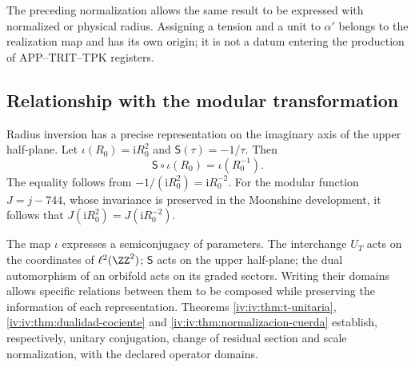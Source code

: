 The preceding normalization allows the same result to be expressed with
normalized or physical radius. Assigning a tension and a
unit to \(\alpha'\) belongs to the realization map and has
its own origin; it is not a datum entering the production
of APP--TRIT--TPK registers.

\subsection{Relationship with the modular transformation}

Radius inversion has a precise representation on the
imaginary axis of the upper half-plane. Let
\(\iota(R_0)=\mathrm iR_0^2\) and
\(\mathsf S(\tau)=-1/\tau\). Then
\begin{equation}
 \mathsf S\circ\iota(R_0)=\iota(R_0^{-1}).
 \label{iv:iv:eq:semiconjugacion-modular}
\end{equation}
The equality follows from
\(-1/(\mathrm iR_0^2)=\mathrm iR_0^{-2}\). For the modular
function \(J=j-744\), whose invariance is preserved in the
Moonshine development, it follows that
\(J(\mathrm iR_0^2)=J(\mathrm iR_0^{-2})\).

The map \(\iota\) expresses a semiconjugacy of parameters.
The interchange \(U_T\) acts on the coordinates of
\(\ell^2(\ZZ^2)\); \(\mathsf S\) acts on the upper
half-plane; the dual automorphism of an orbifold acts on its
graded sectors. Writing their domains allows
specific relations between them to be composed while preserving the
information of each representation. Theorems
\ref{iv:iv:thm:t-unitaria}, \ref{iv:iv:thm:dualidad-cociente}
and \ref{iv:iv:thm:normalizacion-cuerda} establish, respectively,
unitary conjugation, change of residual section and scale
normalization, with the declared operator domains.
